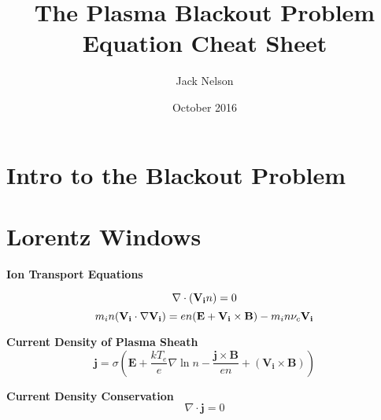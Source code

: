\documentclass[twocolumn]{article}
\title{The Plasma Blackout Problem Equation Cheat Sheet}
\author{Jack Nelson}
\date{October 2016}
\begin{document}
\maketitle


\section{Intro to the Blackout Problem}

\section{Lorentz Windows}

\textbf{Ion Transport Equations}

\begin{equation}
	\nabla \cdot (\mathbf{V_i} n) = 0\\
\end{equation}
\begin{equation}
	m_{ i }n(\mathbf { V_{ i } } \cdot \nabla \mathbf { V_{ i } } )=en(\mathbf { E } +\mathbf { V_{ i } } \times \mathbf { B } )-m_{ i }n\nu _{ c }\mathbf { V_{ i } }\\
\end{equation}

\textbf{Current Density of Plasma Sheath}
\begin{equation}
	\mathbf{j} = \sigma \left(\mathbf{E} + \frac{kT_e}{e}\nabla \ln n - \frac{\mathbf{j} \times \mathbf{B}}{en} + \left(\mathbf{V_i} \times \mathbf{B}\right)\right)
\end{equation}

\textbf{Current Density Conservation}
\begin{equation}
\nabla \cdot \mathbf{j} = 0
\end{equation}
\end{document}

